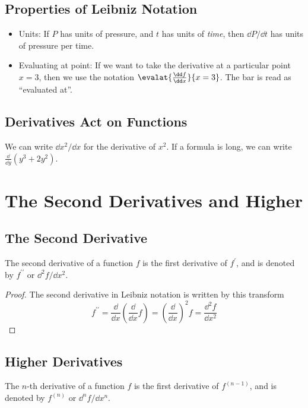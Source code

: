 \subsection{Properties of Leibniz Notation}
\begin{itemize}
\item Units: If $P$ has units of pressure, and $t$ has units of \textit{time}, then $\dd P/\dd t$ has units of pressure per time.
\item Evaluating at point: If we want to take the derivative at a particular point $x=3$, then we use the notation $\evalat{\frac{\dd f}{\dd x}}{x=3}$. The bar is read as ``evaluated at''.
\end{itemize}

\subsection{Derivatives Act on Functions}
We can write $\dd x^2/\dd x$ for the derivative of $x^2$. If a formula is long, we can write $\frac\dd{\dd y}(y^3+2y^2)$.


\section{The Second Derivatives and Higher}
\subsection{The Second Derivative}
The second derivative of a function $f$ is the first derivative of $f^\prime$, and is denoted by $f^{\prime\prime}$ or $\dd^2 f/\dd x^2$.
\begin{proof}
  The second derivative in Leibniz notation is written by this transform
  \[
  f^{\prime\prime}
  =\frac\dd{\dd x}\left(\frac\dd{\dd x}f\right)
  =\left(\frac\dd{\dd x}\right)^2 f
  =\frac{\dd^2 f}{\dd x^2}
  \]
\end{proof}

\subsection{Higher Derivatives}
The $n$-th derivative of a function $f$ is the first derivative of $f^{(n-1)}$, and is denoted by $f^{(n)}$ or $\dd^n f/\dd x^n$.


